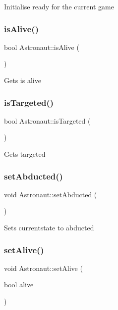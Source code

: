 Initialise ready for the current game \mbox{\label{class_astronaut_aeba104cdac7b5d4bf3be18b890dd0b25}} 
\subsubsection{\texorpdfstring{is\+Alive()}{isAlive()}}
{\footnotesize\ttfamily bool Astronaut\+::is\+Alive (\begin{DoxyParamCaption}{ }\end{DoxyParamCaption})}

Gets is alive \mbox{\label{class_astronaut_abf65a970647ce5388dc8488e5fd232d3}} 
\subsubsection{\texorpdfstring{is\+Targeted()}{isTargeted()}}
{\footnotesize\ttfamily bool Astronaut\+::is\+Targeted (\begin{DoxyParamCaption}{ }\end{DoxyParamCaption})}

Gets targeted \mbox{\label{class_astronaut_a08c429446d2b203c6f0386bfd4ce746e}} 
\subsubsection{\texorpdfstring{set\+Abducted()}{setAbducted()}}
{\footnotesize\ttfamily void Astronaut\+::set\+Abducted (\begin{DoxyParamCaption}{ }\end{DoxyParamCaption})}

Sets currentstate to abducted \mbox{\label{class_astronaut_ac969b5ce6219bb260e0c88a8ec57f459}} 
\subsubsection{\texorpdfstring{set\+Alive()}{setAlive()}}
{\footnotesize\ttfamily void Astronaut\+::set\+Alive (\begin{DoxyParamCaption}\item[{bool}]{alive }\end{DoxyParamCaption})}

